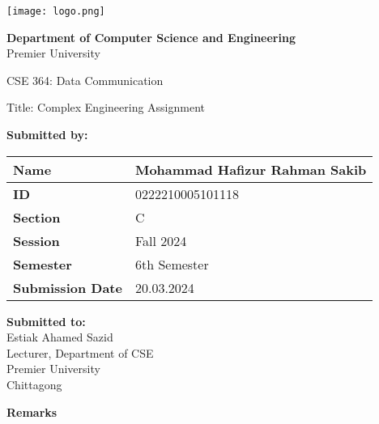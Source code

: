 \documentclass{scrreprt}
\renewcommand{\arraystretch}{1.5}
\begin{document}
\begin{titlepage}
    \centering
    \texttt{[image: logo.png]} %
    \vspace{1cm}

    \textbf{Department of Computer Science and Engineering}\\
    Premier University
    \vspace{1cm}

    \huge \textnormal{CSE 364: Data Communication}
    \vspace{1in} %

    \Large \textnormal{Title: Complex Engineering Assignment}
    \vspace{0.5in} %

    \large
    \textbf{Submitted by:}
    \vspace{0.5cm}

    \renewcommand{\arraystretch}{1.5} %
    \begin{tabular}{|p{}|p{}|} %
        \hline
        \textbf{Name} & Mohammad Hafizur Rahman Sakib\\
        \hline
        \textbf{ID} & 0222210005101118 \\
        \hline
        \textbf{Section} & C \\
        \hline
        \textbf{Session} & Fall 2024 \\
        \hline
        \textbf{Semester} & 6th Semester \\
        \hline
        \textbf{Submission Date} & 20.03.2024 \\
        \hline
    \end{tabular}
    \vspace{1cm}

    \begin{minipage}[t]{0.48\textwidth}
        \textbf{Submitted to:}\\
        Estiak Ahamed Sazid\\
        Lecturer, Department of CSE\\
        Premier University\\
        Chittagong
    \end{minipage}%
    \hfill
    \begin{minipage}[t]{0.48\textwidth}
        \raggedleft
        \textbf{Remarks}\\
        \vspace{0.5cm} %
    \end{minipage}

    \date{\today}
    \vfill
\end{titlepage}
\end{document}
